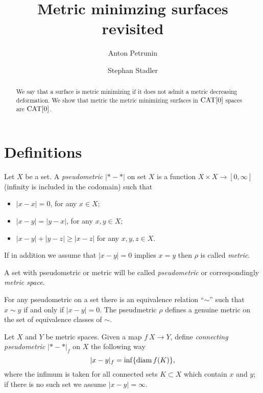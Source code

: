 \documentclass[a4paper,10pt]{amsart}
\begin{document}
\title{Metric minimzing surfaces revisited}
\author{Anton Petrunin}
\address{A. Petrunin\newline\vskip-4mm
Math. Dept. PSU,
University Park, PA 16802,
USA}
\author{Stephan Stadler}


\date{}

\begin{abstract}
We say that a surface is metric minimizing if it does not admit a metric decreasing deformation.
We show that metric the metric minimizing surfaces in $\mathop{\rm CAT}\nolimits[0]$ spaces are $\mathop{\rm CAT}\nolimits[0]$.
\end{abstract}
\maketitle



\section{Definitions}

Let $X$ be a set.
A \emph{pseudometric} $|{*}-{*}|$ on set $X$ 
is a function $X\times X\to[0,\infty]$ (infinity is included in the codomain)
such that 
\begin{itemize}
\item $|x-x|=0$, for any $x\in X$;
\item $|x-y|=|y-x|$, for any $x,y\in X$;
\item $|x-y|+|y-z|\ge|x-z|$ for any  $x,y,z\in X$.
\end{itemize}

If in addition we assume that $|x-y|=0$ implies $x=y$ then $\rho$ is called \emph{metric}.


A set with pseudometric or metric will be called \emph{pseudometric} or correspondingly \emph{metric space}.

For any pseudometric on a set 
there is an equivalence relation ``$\sim$''
such that $x\sim y$ if and only if $|x-y|=0$.
The pseudmetric $\rho$ defines a genuine metric on the set of equivalence classes of $\sim$.

Let $X$ and $Y$ be metric spaces.
Given a map $f\:X\to Y$,
define \emph{connecting pseudometric} $|{*}-{*}|_f$ on $X$ 
the following way
\[|x-y|_f=\inf\{\mathop{\rm diam}\nolimits f(K)\},\]
where the infimum is taken for all connected sets $K\subset X$ which contain $x$ and $y$;
if there is no such set we assume $|x-y|=\infty$.
\end{document}
